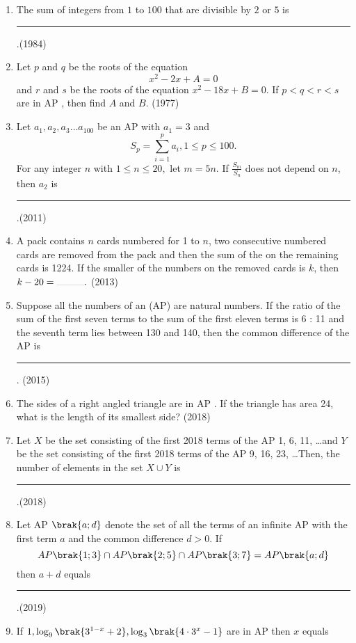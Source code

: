 \begin{enumerate}    [label=\thesubsection.\arabic*, ref=\thesubsection.\theenumi]
%
\item  The sum of integers from $1$ to $100$ that are divisible by $2$ or $5$ is \rule{1cm}{0.1pt}.\hfill{(1984)}
		  \item  Let $p$ and $q$ be the roots of the equation                    $${x^2-2x+A=0}$$ and $r$ and $s$ be the roots of the                     equation ${x^2-18x+B=0}$. If ${p<q<r<s}$ are                                      in  AP ,  then find $A$ and $B$. \hfill{(1977)}
\item Let $a_{1},  a_{2},  a_{3}\dots a_{100}$ be an  AP  with $a_{1}= 3$ and $$S_{p} =\sum\limits_{i=1}^{p} a_{i}, 1\leq p\leq 100.$$ For any integer $n$ with $1 \leq n \leq 20, $ let $m= 5n$. If $\frac{S_{m}}{S_{n}}$ does not depend on $n$,  then $a_{2}$ is \rule{1cm}{0.1pt}.\hfill(2011)
%
   \item A pack contains $n$ cards numbered for 1 to $n$,  two consecutive numbered cards are removed from the pack and then the sum of the on the remaining cards is 1224. If the smaller of the numbers on the removed cards is $k$,  then $k - 20=\rule{1cm}{0.1pt}.$ \hfill(2013)
   \item Suppose all the numbers of an (AP) are natural numbers. If the ratio of the sum of the first seven terms to the sum of the first eleven terms is 6 : 11 and the seventh term lies between 130 and 140,  then the common difference of the AP is \rule{1cm}{0.1pt}.
    \hfill(2015)
%
   \item The sides of a right angled triangle are in  AP . If the triangle has area 24,  what is the length of its smallest side? 
%   
   \hfill(2018)
%
   \item Let $X$ be the set consisting of the first 2018 terms of the  AP  1,  6,  11,  \dots  and $Y$ be the set consisting of the first 2018 terms of the  AP  9,  16,  23,  \dots Then,  the number of elements in the set $ X \cup Y $ is \rule{1cm}{0.1pt}.\hfill(2018)
   \item Let AP $\brak{a; d}$ denote the set of all the terms of an infinite  AP  with the first term $a$ and the common difference $d>0$. If $$AP\brak{1; 3}\cap AP\brak{2; 5}\cap AP\brak{3; 7} = AP\brak{a; d}$$ then $a + d$ equals \rule{1cm}{0.1pt}.\hfill(2019)
%   
	\item {If $ 1,  \log_9 \brak{3^{1-x} +2},  \log_3 \brak{4\cdot3^x -1}$ are in AP then $x$ equals}
{\hfill{}}
\begin{multicols}{4}

\end{multicols}
\end{enumerate}
